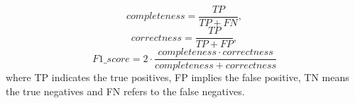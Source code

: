 \begin{equation}
 {completeness} = \frac{TP}{TP+FN},
\end{equation}
\begin{equation}
{correctness} = \frac{TP}{TP+FP},
\end{equation}
\begin{equation}
{F1\_score}= 2\cdot\frac{completeness\cdot correctness}{completeness+correctness}
\end{equation}
%
where TP indicates the true positives, FP implies the false positive, TN means the true negatives and FN refers to the false negatives.
